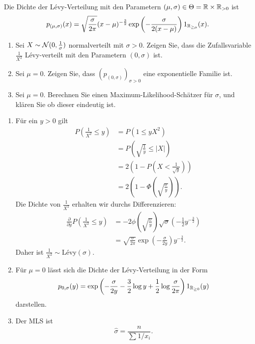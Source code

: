  Die Dichte der L\'evy-Verteilung mit den
Parametern $(\mu,\sigma)\in \Theta = \mathbb R \times \mathbb R_{>0}$ ist
\begin{equation*}
    p_{(\mu, \sigma)}(x) = \sqrt{ \frac{\sigma}{2\pi}} (x-\mu)^{-\frac{3}{2}} 
    \exp\left( -\frac{\sigma}{2(x-\mu)} \right) 1_{\mathbb R_{\geq \mu}} (x).
\end{equation*}
\begin{enumerate}
    \item Sei $X\sim \mathcal N (0, \frac{1}{\sigma})$ normalverteilt mit $\sigma>0$.
        Zeigen Sie, dass die Zufallsvariable $\frac{1}{X^2}$ L\'evy-verteilt mit den Parametern
        $(0,\sigma)$ ist.
    \item Sei $\mu=0$. Zeigen Sie, dass $(p_{(0,\sigma)})_{\sigma>0}$ eine
        exponentielle Familie ist. 
    \item Sei $\mu=0$. Berechnen Sie einen Maximum-Likelihood-Schätzer für $\sigma$, und
        klären Sie ob dieser eindeutig ist.
\end{enumerate}

\solution 
\begin{enumerate}
    \item Für ein $y>0$ gilt
        \begin{align*}
            P \left( \frac{1}{X^{2}} \leq y \right) &= P \left( 1 \leq y X^{2}   \right) \\
            &= P \left( \sqrt{\frac{1}{y}} \leq | X | \right) \\
            &= 2 \left( 1 - P \left( X < \frac{1}{\sqrt{y}} \right) \right) \\
            &= 2 \left( 1 - \Phi\left( \sqrt{ \frac{\sigma}{y}} \right) \right).
        \end{align*}
        Die Dichte von $\frac{1}{X^2}$ erhalten wir durchs Differenzieren:
        \begin{align*}
            \frac{\partial}{\partial y} P \left( \frac{1}{X^2} \leq y \right) &=
            -2 \phi \left( \sqrt{\frac{\sigma}{y}} \right) \sqrt{\sigma} 
            \left( -\frac{1}{2} y^{-\frac{3}{2}} \right) \\
            &= \sqrt{\frac{\sigma}{2 \pi}} \exp \left( - \frac{\sigma}{2 y} \right) y^{-\frac{3}{2}}.
        \end{align*}
        Daher ist $\frac{1}{X^2} \sim \text{L\'evy}(\sigma)$.

    \item Für $\mu=0$ lässt sich die Dichte der L\'evy-Verteilung in der Form
        \begin{equation*}
            p_{0,\sigma}(y) = \exp \left( -\frac{\sigma}{2y} - \frac{3}{2}\log y 
            + \frac{1}{2} \log \frac{\sigma}{2 \pi}  \right) 1_{\mathbb R_{\geq 0}} (y)
        \end{equation*}
        darstellen.

    \item Der MLS ist
        \begin{equation*}
            \hat \sigma = \frac{n}{ \sum_{}^{} 1/x_i}.
        \end{equation*}
\end{enumerate}


